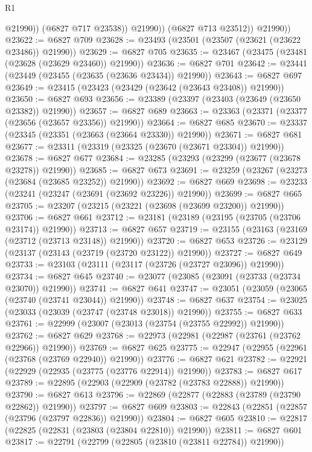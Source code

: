 \begin{lexlean}{R1}
\begin{coremodule}
                    @21990))
                (@6827 @717 @23538))
              @21990))
          (@6827 @713 @23512))
        @21990))
@23622 := @6827 @709
@23628 := @23493 (@23501 (@23507 (@23621 (@23622 @23486)) @21990))
@23629 := @6827 @705
@23635 := @23467 (@23475 (@23481 (@23628 (@23629 @23460)) @21990))
@23636 := @6827 @701
@23642 := @23441 (@23449 (@23455 (@23635 (@23636 @23434)) @21990))
@23643 := @6827 @697
@23649 := @23415 (@23423 (@23429 (@23642 (@23643 @23408)) @21990))
@23650 := @6827 @693
@23656 := @23389 (@23397 (@23403 (@23649 (@23650 @23382)) @21990))
@23657 := @6827 @689
@23663 := @23363 (@23371 (@23377 (@23656 (@23657 @23356)) @21990))
@23664 := @6827 @685
@23670 := @23337 (@23345 (@23351 (@23663 (@23664 @23330)) @21990))
@23671 := @6827 @681
@23677 := @23311 (@23319 (@23325 (@23670 (@23671 @23304)) @21990))
@23678 := @6827 @677
@23684 := @23285 (@23293 (@23299 (@23677 (@23678 @23278)) @21990))
@23685 := @6827 @673
@23691 := @23259 (@23267 (@23273 (@23684 (@23685 @23252)) @21990))
@23692 := @6827 @669
@23698 := @23233 (@23241 (@23247 (@23691 (@23692 @23226)) @21990))
@23699 := @6827 @665
@23705 := @23207 (@23215 (@23221 (@23698 (@23699 @23200)) @21990))
@23706 := @6827 @661
@23712 := @23181 (@23189 (@23195 (@23705 (@23706 @23174)) @21990))
@23713 := @6827 @657
@23719 := @23155 (@23163 (@23169 (@23712 (@23713 @23148)) @21990))
@23720 := @6827 @653
@23726 := @23129 (@23137 (@23143 (@23719 (@23720 @23122)) @21990))
@23727 := @6827 @649
@23733 := @23103 (@23111 (@23117 (@23726 (@23727 @23096)) @21990))
@23734 := @6827 @645
@23740 := @23077 (@23085 (@23091 (@23733 (@23734 @23070)) @21990))
@23741 := @6827 @641
@23747 := @23051 (@23059 (@23065 (@23740 (@23741 @23044)) @21990))
@23748 := @6827 @637
@23754 := @23025 (@23033 (@23039 (@23747 (@23748 @23018)) @21990))
@23755 := @6827 @633
@23761 := @22999 (@23007 (@23013 (@23754 (@23755 @22992)) @21990))
@23762 := @6827 @629
@23768 := @22973 (@22981 (@22987 (@23761 (@23762 @22966)) @21990))
@23769 := @6827 @625
@23775 := @22947 (@22955 (@22961 (@23768 (@23769 @22940)) @21990))
@23776 := @6827 @621
@23782 := @22921 (@22929 (@22935 (@23775 (@23776 @22914)) @21990))
@23783 := @6827 @617
@23789 := @22895 (@22903 (@22909 (@23782 (@23783 @22888)) @21990))
@23790 := @6827 @613
@23796 := @22869 (@22877 (@22883 (@23789 (@23790 @22862)) @21990))
@23797 := @6827 @609
@23803 := @22843 (@22851 (@22857 (@23796 (@23797 @22836)) @21990))
@23804 := @6827 @605
@23810 := @22817 (@22825 (@22831 (@23803 (@23804 @22810)) @21990))
@23811 := @6827 @601
@23817 := @22791 (@22799 (@22805 (@23810 (@23811 @22784)) @21990))

\end{coremodule}
\end{lexlean}
